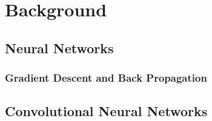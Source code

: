 
\enlargethispage{-1\baselineskip}

\chapter{Background}

\lipsum[1-2]

\section{Neural Networks}

\lipsum[3]

\subsection{Gradient Descent and Back Propagation}

\lipsum[4]

\section{Convolutional Neural Networks}

\lipsum[5-6]



